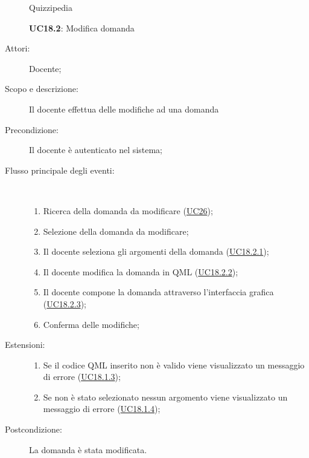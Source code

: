 	\begin{figure}[H]
		\centering
		\begin{resizedtikzpicture}{\textwidth}
		\begin{umlsystem}[x=0, fill=lightgray!20]{Quizzipedia}
		\end{umlsystem}
		\end{resizedtikzpicture}
		\caption{\textbf{UC18.2}: Modifica domanda}
		\label{UC18.2}
	\end{figure}
\begin{description}
\item[Attori:] Docente;
\item[Scopo e descrizione:] Il docente effettua delle modifiche ad una domanda 
      \item[Precondizione:] Il docente è autenticato nel sistema;

        \item[Flusso principale degli eventi:] \ 
 \begin{enumerate}
          \item Ricerca della domanda da modificare (\hyperlink{UC26}{UC26});
          \item Selezione della domanda da modificare;
          \item Il docente seleziona gli argomenti della domanda	 (\hyperlink{UC18.2.1}{UC18.2.1});
          \item Il docente modifica la domanda in QML	 (\hyperlink{UC18.2.2}{UC18.2.2});
          \item Il docente compone la domanda attraverso l'interfaccia grafica (\hyperlink{UC18.2.3}{UC18.2.3});
          \item Conferma delle modifiche;

      \end{enumerate}
    \item[Estensioni:]
      \begin{enumerate}
          \item Se il codice QML inserito non è valido viene visualizzato un messaggio di errore (\hyperlink{UC18.1.3}{UC18.1.3});
          \item Se non è stato selezionato nessun argomento viene visualizzato un messaggio di errore (\hyperlink{UC18.1.4}{UC18.1.4});

      \end{enumerate}
    \item[Postcondizione:] La domanda è stata modificata.
  \end{description}
\hypertarget{UC18.2.1}{}
